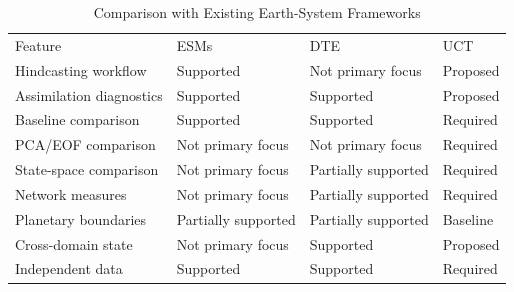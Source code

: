 \begin{table}[tb]
\caption{\label{tab:framework_comparison}Comparison with Existing Earth-System Frameworks}
\footnotesize
\begin{ruledtabular}
\begin{tabular}{llll}
Feature & ESMs & DTE & UCT \\
Hindcasting workflow & Supported & Not primary focus & Proposed \\
Assimilation diagnostics & Supported & Supported & Proposed \\
Baseline comparison & Supported & Supported & Required \\
PCA/EOF comparison & Not primary focus & Not primary focus & Required \\
State-space comparison & Not primary focus & Partially supported & Required \\
Network measures & Not primary focus & Partially supported & Required \\
Planetary boundaries & Partially supported & Partially supported & Baseline \\
Cross-domain state & Not primary focus & Supported & Proposed \\
Independent data & Supported & Supported & Required \\
\end{tabular}
\end{ruledtabular}
\end{table}

